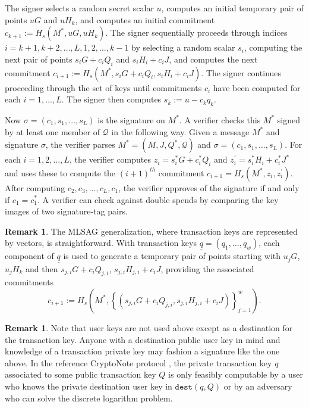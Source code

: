 \documentclass{mrl}
\theoremstyle{definition}
\newtheorem{disc}[theorem]{Remark}
\begin{document}
The signer selects a random secret scalar $u$, computes an initial temporary pair of points $uG$ and $uH_{k}$, and computes an initial commitment $c_{k+1} := H_{s}(M^*,uG, uH_k)$. The signer sequentially proceeds through indices $i=k+1, k+2, \ldots, L, 1, 2, \ldots, k-1$  by selecting a random scalar $s_i$, computing the next pair of points $s_iG + c_i Q_i$ and $s_i H_i + c_i J$, and computes the next commitment $c_{i+1}:=H_{s}(M^*,s_i G + c_i Q_i, s_i H_i + c_i J)$. The signer continues proceeding through the set of keys until commitments $c_i$ have been computed for each $i=1, \ldots, L$. The signer then computes $s_{k}:=u - c_{k}q_{k}$. 

Now $\sigma=(c_1, s_1, \ldots, s_L)$ is the signature on $M^*$. A verifier checks this $M^*$ signed by at least one member of $\mathcal{Q}$ in the following way. Given a message $M^*$ and signature $\sigma$, the verifier parses $M^* = (M,J,Q^*,\mathcal{Q})$ and $\sigma = (c_1, s_1, \ldots, s_L)$. For each $i=1,2,\ldots, L$, the verifier computes $z_{i} = s_i^* G + c_i^* Q_i$ and $z_{i}^{\prime} = s_i^* H_i + c_i^* J^*$ and uses these to compute the $(i+1)^{th}$ commitment $c_{i+1} = H_{s}(M^*, z_i, z^{\prime}_i)$. After computing $c_2, c_3, \ldots, c_L, c_1$, the verifier approves of the signature if and only if $c_1 = c_1^*$. A verifier can check against double spends by comparing the key images of two signature-tag pairs. 

\begin{disc}
The MLSAG generalization, where transaction keys are represented by vectors, is straightforward. With transaction keys $\underline{q}=(q_1,\ldots,q_w)$, each component of $\underline{q}$ is used to generate a temporary pair of points starting with $u_jG$, $u_j H_k$ and then $s_{j,i} G + c_{i} Q_{j,i}$, $s_{j,i} H_{j,i} + c_{i} J$, providing the associated commitments
\[c_{i+1}:=H_{s}\left(M^*,\left\{(s_{j,i} G + c_i Q_{j,i}, s_{j,i} H_{j,i} + c_i J)\right\}_{j=1}^{w}\right).\]
\end{disc}


\begin{disc}
Note that user keys are not used above except as a destination for the transaction key. Anyone with a destination public user key in mind and knowledge of a transaction private key may fashion a signature like the one above. In the reference CryptoNote protocol \cite{van2013cryptonote}, the private transaction key $q$ associated to some public transaction key $Q$ is only feasibly computable by a user who knows the private destination user key in $\texttt{dest}(q,Q)$ or by an adversary who can solve the discrete logarithm problem.
\end{disc}
\end{document}
